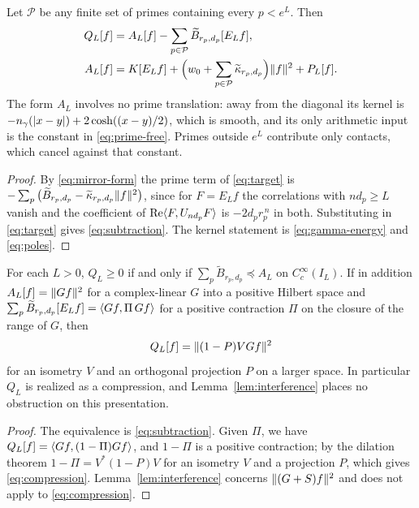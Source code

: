\begin{theorem}\label{thm:subtraction}
Let $\mathcal P$ be any finite set of primes containing every $p<e^L$. Then
\begin{align}
 Q_L[f]&=A_L[f]-\sum_{p\in\mathcal P}\widetilde B_{r_p,d_p}[E_Lf],
 \label{eq:subtraction}\\
 A_L[f]&=K[E_Lf]
  +\Big(w_0+\sum_{p\in\mathcal P}\widetilde\kappa_{r_p,d_p}\Big)\lVert f\rVert^2
  +P_L[f].
 \label{eq:prime-free}
\end{align}
The form $A_L$ involves no prime translation: away from the diagonal its
kernel is $-n_{\gamma}(|x-y|)+2\cosh((x-y)/2)$, which is smooth, and its only
arithmetic input is the constant in \eqref{eq:prime-free}. Primes outside
$e^L$ contribute only contacts, which cancel against that constant.
\end{theorem}
\begin{proof}
By \eqref{eq:mirror-form} the prime term of \eqref{eq:target} is
$-\sum_p\big(\widetilde B_{r_p,d_p}-\widetilde\kappa_{r_p,d_p}\lVert f\rVert^2\big)$,
since for $F=E_Lf$ the correlations with $nd_p\geq L$ vanish and the
coefficient of $\operatorname{Re}\langle F,U_{nd_p}F\rangle$ is $-2d_pr_p^{\,n}$ in both. Substituting
in \eqref{eq:target} gives \eqref{eq:subtraction}. The kernel statement is
\eqref{eq:gamma-energy} and \eqref{eq:poles}.
\end{proof}

\begin{corollary}
\label{cor:domination}
For each $L>0$, $Q_L\geq0$ if and only if
$\sum_{p}\widetilde B_{r_p,d_p}\preceq A_L$ on $C_c^\infty(I_L)$. If in
addition $A_L[f]=\lVert Gf\rVert^2$ for a complex-linear $G$ into a positive
Hilbert space and
$\sum_p\widetilde B_{r_p,d_p}[E_Lf]=\langle Gf,\Pi\,Gf\rangle$ for a positive
contraction $\Pi$ on the closure of the range of $G$, then
\begin{equation}\label{eq:compression}
 Q_L[f]=\lVert (1-P)VGf\rVert^2
\end{equation}
for an isometry $V$ and an orthogonal projection $P$ on a larger space. In
particular $Q_L$ is realized as a compression, and
Lemma~\ref{lem:interference} places no obstruction on this presentation.
\end{corollary}
\begin{proof}
The equivalence is \eqref{eq:subtraction}. Given $\Pi$, we have
$Q_L[f]=\langle Gf,(1-\Pi)Gf\rangle$, and $1-\Pi$ is a positive contraction; by the
dilation theorem $1-\Pi=V^*(1-P)V$ for an isometry $V$ and a projection $P$,
which gives \eqref{eq:compression}. Lemma~\ref{lem:interference} concerns
$\lVert (G+S)f\rVert^2$ and does not apply to \eqref{eq:compression}.
\end{proof}

